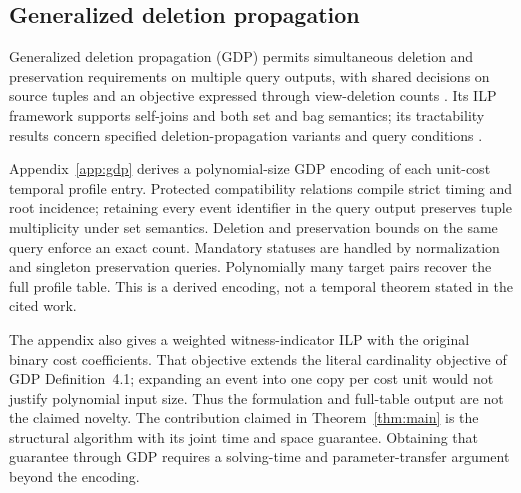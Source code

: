 \subsection{Generalized deletion propagation}\label{sec:gdp}

Generalized deletion propagation (GDP) permits simultaneous deletion and
preservation requirements on multiple query outputs, with shared decisions
on source tuples and an objective expressed through view-deletion counts
\citep[Definition 4.1]{makhija2025gdp}. Its ILP framework supports self-joins
and both set and bag semantics; its tractability results concern specified
deletion-propagation variants and query conditions
\citep[Sections 5--6]{makhija2025gdp}.

Appendix~\ref{app:gdp} derives a polynomial-size GDP encoding of each
unit-cost temporal profile entry. Protected compatibility relations compile
strict timing and root incidence; retaining every event identifier in the
query output preserves tuple multiplicity under set semantics. Deletion and
preservation bounds on the same query enforce an exact count. Mandatory
statuses are handled by normalization and singleton preservation queries.
Polynomially many target pairs recover the full profile table. This is a
derived encoding, not a temporal theorem stated in the cited work.

The appendix also gives a weighted witness-indicator ILP with the original
binary cost coefficients. That objective extends the literal cardinality
objective of GDP Definition~4.1; expanding an event into one copy per cost
unit would not justify polynomial input size. Thus the formulation and
full-table output are not the claimed novelty. The contribution claimed in
Theorem~\ref{thm:main} is the structural algorithm with its joint time and
space guarantee. Obtaining that guarantee through GDP requires a solving-time
and parameter-transfer argument beyond the encoding.
